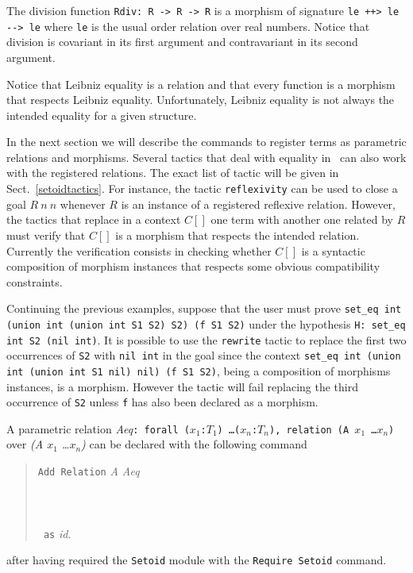 \begin{cscexample}
The division function \texttt{Rdiv: R -> R -> R} is a morphism of
signature \texttt{le ++> le -{}-> le} where \texttt{le} is
the usual order relation over real numbers. Notice that division is
covariant in its first argument and contravariant in its second
argument.
\end{cscexample}

Notice that Leibniz equality is a relation and that every function is a
morphism that respects Leibniz equality. Unfortunately, Leibniz equality
is not always the intended equality for a given structure.

In the next section we will describe the commands to register terms as
parametric relations and morphisms. Several tactics that deal with equality
in \Coq\ can also work with the registered relations.
The exact list of tactic will be given in Sect.~\ref{setoidtactics}.
For instance, the
tactic \texttt{reflexivity} can be used to close a goal $R~n~n$ whenever
$R$ is an instance of a registered reflexive relation. However, the tactics
that replace in a context $C[]$ one term with another one related by $R$
must verify that $C[]$ is a morphism that respects the intended relation.
Currently the verification consists in checking whether $C[]$ is a syntactic
composition of morphism instances that respects some obvious
compatibility constraints.

\begin{cscexample}[Rewriting]
Continuing the previous examples, suppose that the user must prove
\texttt{set\_eq int (union int (union int S1 S2) S2) (f S1 S2)} under the
hypothesis \texttt{H: set\_eq int S2 (nil int)}. It is possible to
use the \texttt{rewrite} tactic to replace the first two occurrences of
\texttt{S2} with \texttt{nil int} in the goal since the context
\texttt{set\_eq int (union int (union int S1 nil) nil) (f S1 S2)}, being
a composition of morphisms instances, is a morphism. However the tactic
will fail replacing the third occurrence of \texttt{S2} unless \texttt{f}
has also been declared as a morphism.
\end{cscexample}

A parametric relation
\textit{Aeq}\texttt{: forall ($x_1$:$T_1$) \ldots ($x_n$:$T_n$),
 relation (A $x_1$ \ldots $x_n$)} over \textit{(A $x_1$ \ldots $x_n$)}
can be declared with the following command

\begin{verse}
  \texttt{Add Relation} \textit{A Aeq}\\
  ~\\
  ~\\
  ~\\
  \texttt{~as} \textit{id}.
\end{verse}
after having required the \texttt{Setoid} module with the
\texttt{Require Setoid} command.

